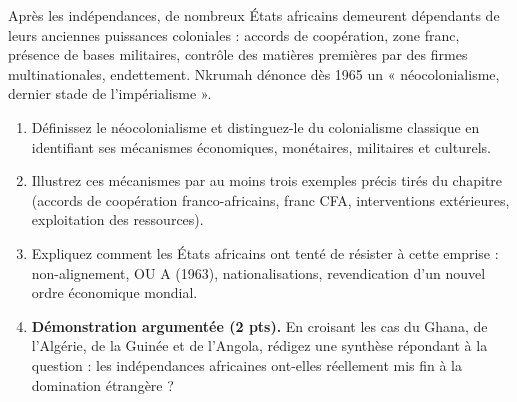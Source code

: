 \documentclass[11pt]{article}
\begin{document}
\begin{exercice}
Après les indépendances, de nombreux États africains demeurent dépendants de leurs anciennes puissances coloniales : accords de coopération, zone franc, présence de bases militaires, contrôle des matières premières par des firmes multinationales, endettement. Nkrumah dénonce dès 1965 un « néocolonialisme, dernier stade de l'impérialisme ».
\begin{enumerate}
\item Définissez le néocolonialisme et distinguez-le du colonialisme classique en identifiant ses mécanismes économiques, monétaires, militaires et culturels.
\item Illustrez ces mécanismes par au moins trois exemples précis tirés du chapitre (accords de coopération franco-africains, franc CFA, interventions extérieures, exploitation des ressources).
\item Expliquez comment les États africains ont tenté de résister à cette emprise : non-alignement, OU A (1963), nationalisations, revendication d'un nouvel ordre économique mondial.
\item \textbf{Démonstration argumentée (2 pts).} En croisant les cas du Ghana, de l'Algérie, de la Guinée et de l'Angola, rédigez une synthèse répondant à la question : les indépendances africaines ont-elles réellement mis fin à la domination étrangère ?
\end{enumerate}
\end{exercice}
\end{document}

